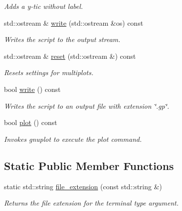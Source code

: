 \begin{DoxyCompactItemize}
\begin{DoxyCompactList}\small\item\em Adds a y-\/tic without label. \end{DoxyCompactList}\item 
\hypertarget{a00426_aba133bca853bbc71c1ac3e75c0448f08}{std\-::ostream \& \hyperlink{a00426_aba133bca853bbc71c1ac3e75c0448f08}{write} (std\-::ostream \&os) const }\label{a00426_aba133bca853bbc71c1ac3e75c0448f08}

\begin{DoxyCompactList}\small\item\em Writes the script to the output stream. \end{DoxyCompactList}\item 
\hypertarget{a00426_adb359e4e1124a858a0bfeeef4b7dec40}{std\-::ostream \& \hyperlink{a00426_adb359e4e1124a858a0bfeeef4b7dec40}{reset} (std\-::ostream \&) const }\label{a00426_adb359e4e1124a858a0bfeeef4b7dec40}

\begin{DoxyCompactList}\small\item\em Resets settings for multiplots. \end{DoxyCompactList}\item 
\hypertarget{a00426_a7918e8473da0f80945f03f6f2a625876}{bool \hyperlink{a00426_a7918e8473da0f80945f03f6f2a625876}{write} () const }\label{a00426_a7918e8473da0f80945f03f6f2a625876}

\begin{DoxyCompactList}\small\item\em Writes the script to an output file with extension \char`\"{}.\-gp\char`\"{}. \end{DoxyCompactList}\item 
bool \hyperlink{a00426_a93778a0558f6717d6aef3100c5f43847}{plot} () const 
\begin{DoxyCompactList}\small\item\em Invokes gnuplot to execute the plot command. \end{DoxyCompactList}\end{DoxyCompactItemize}
\subsection*{Static Public Member Functions}
\begin{DoxyCompactItemize}
\item 
\hypertarget{a00426_a2e75aba67172c33b19cd6340b9259301}{static std\-::string \hyperlink{a00426_a2e75aba67172c33b19cd6340b9259301}{file\-\_\-extension} (const std\-::string \&)}\label{a00426_a2e75aba67172c33b19cd6340b9259301}

\begin{DoxyCompactList}\small\item\em Returns the file extension for the terminal type argument. \end{DoxyCompactList}\end{DoxyCompactItemize}
